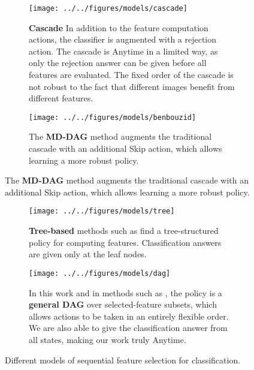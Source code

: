 \begin{figure}[H]
\centering
\begin{subfigure}[b]{\linewidth}
    \texttt{[image: ../../figures/models/cascade]}
    \caption{
\textbf{Cascade}
In addition to the feature computation actions, the classifier is augmented with a rejection action.
The cascade is Anytime in a limited way, as only the rejection answer can be given before all features are evaluated.
The fixed order of the cascade is not robust to the fact that different images benefit from different features.
}
\end{subfigure}
\begin{subfigure}[b]{.9\linewidth}
    \texttt{[image: ../../figures/models/benbouzid]}
    \caption{
The \textbf{MD-DAG} method \parencite{Benbouzid-ICML-2012} augments the traditional cascade with an additional Skip action, which allows learning a more robust policy.
}
\end{subfigure}
\end{figure}
\begin{figure}[H]
\ContinuedFloat %
\centering
\begin{subfigure}[b]{.9\linewidth}
    \texttt{[image: ../../figures/models/tree]}
    \caption{
\textbf{Tree-based} methods such as \cite{Xu-ICML-2012} find a tree-structured policy for computing features.
Classification answers are given only at the leaf nodes.
    }
\end{subfigure}
\begin{subfigure}[b]{.9\linewidth}
    \texttt{[image: ../../figures/models/dag]}
    \caption{
In this work and in methods such as \cite{Gao-NIPS-2011}, the policy is a \textbf{general DAG} over selected-feature subsets, which allows actions to be taken in an entirely flexible order.
We are also able to give the classification answer from all states, making our work truly Anytime.
    }
\end{subfigure}
\caption{
Different models of sequential feature selection for classification.
}\label{fig:models}
\end{figure}
